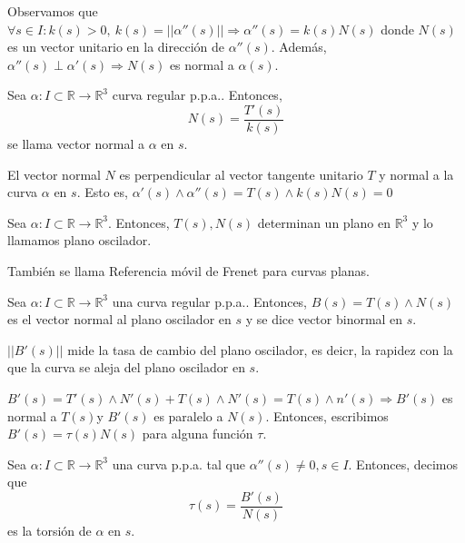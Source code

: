 \begin{note}
  Observamos que $\forall s \in I: k(s) > 0, \ k(s) = ||\alpha''(s)|| \Rightarrow \alpha''(s) = k(s) N(s)$ donde $N(s)$ es un vector unitario en la dirección de $\alpha''(s)$. Además, $\alpha''(s) \perp \alpha'(s) \Rightarrow N(s)$ es normal a $\alpha(s)$.
\end{note}

\begin{defn}
  Sea $\alpha  : I \subset \mathbb{R} \to \mathbb{R}^{3}$ curva regular p.p.a.. Entonces, 
  \[ 
    N(s) = \frac{T'(s)}{k(s)} 
  \] 
  se llama vector normal a $\alpha$ en $s$.
\end{defn}

\begin{obs}
  El vector normal $N$ es perpendicular al vector tangente unitario $T$ y normal a la curva $\alpha$ en $s$. Esto es, $\alpha'(s) \wedge \alpha''(s) = T(s) \wedge k(s)N(s) = 0$
\end{obs}

\begin{defn}
  Sea $\alpha  : I \subset \mathbb{R} \to \mathbb{R}^{3}$. Entonces, $T(s),N(s)$ determinan un plano en $\mathbb{R}^{3}$ y lo llamamos plano oscilador.
\end{defn}

\begin{obs}
  También se llama Referencia móvil de Frenet para curvas planas.
\end{obs}

\begin{defn}
  Sea $\alpha  : I \subset \mathbb{R} \to \mathbb{R}^{3}$ una curva regular p.p.a.. Entonces, $B(s) = T(s) \wedge N(s)$ es el vector normal al plano oscilador en $s$ y se dice vector binormal en $s$.
\end{defn}

\begin{obs}
  $||B'(s)||$ mide la tasa de cambio del plano oscilador, es deicr, la rapidez con la que la curva se aleja del plano oscilador en $s$.
\end{obs}

\begin{note}
  $B'(s) = T'(s) \wedge N'(s) + T(s) \wedge N'(s) = T(s) \wedge n'(s) \Rightarrow B'(s)$ es normal a $T(s)$y $B'(s)$ es paralelo a $N(s)$. Entonces, escribimos $B'(s) = \tau(s) N(s)$ para alguna función $\tau$.
\end{note}

\begin{defn}[Torsión]
  Sea $\alpha  : I \subset \mathbb{R} \to \mathbb{R}^{3}$ una curva p.p.a. tal que $\alpha''(s) \neq 0, s \in I$. Entonces, decimos que
  \[
    \tau(s) = \frac{B'(s)}{N(s)}
  \]
  es la torsión de $\alpha$ en $s$.
\end{defn}

